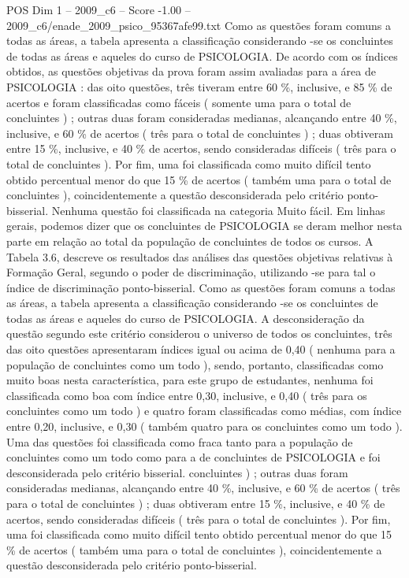 \begin{textsample}{POS Dim 1 – 2009\_c6 – Score -1.00 – 2009\_c6/enade\_2009\_psico\_95367afe99.txt}
Como as questões foram comuns a todas as áreas, a tabela apresenta a classificação considerando -se os concluintes de todas as áreas e aqueles do curso de PSICOLOGIA.
De acordo com os índices obtidos, as questões objetivas da prova foram assim avaliadas para a área de PSICOLOGIA : das oito questões, três tiveram entre 60 \%, inclusive, e 85 \% de acertos e foram classificadas como fáceis ( somente uma para o total de concluintes ) ; outras duas foram consideradas medianas, alcançando entre 40 \%, inclusive, e 60 \% de acertos ( três para o total de concluintes ) ; duas obtiveram entre 15 \%, inclusive, e 40 \% de acertos, sendo consideradas difíceis ( três para o total de concluintes ).
Por fim, uma foi classificada como muito difícil tento obtido percentual menor do que 15 \% de acertos ( também uma para o total de concluintes ), coincidentemente a questão desconsiderada pelo critério ponto-bisserial.
Nenhuma questão foi classificada na categoria Muito fácil.
Em linhas gerais, podemos dizer que os concluintes de PSICOLOGIA se deram melhor nesta parte em relação ao total da população de concluintes de todos os cursos.
A Tabela 3.6, descreve os resultados das análises das questões objetivas relativas à Formação Geral, segundo o poder de discriminação, utilizando -se para tal o índice de discriminação ponto-bisserial.
Como as questões foram comuns a todas as áreas, a tabela apresenta a classificação considerando -se os concluintes de todas as áreas e aqueles do curso de PSICOLOGIA.
A desconsideração da questão segundo este critério considerou o universo de todos os concluintes, três das oito questões apresentaram índices igual ou acima de 0,40 ( nenhuma para a população de concluintes como um todo ), sendo, portanto, classificadas como muito boas nesta característica, para este grupo de estudantes, nenhuma foi classificada como boa com índice entre 0,30, inclusive, e 0,40 ( três para os concluintes como um todo ) e quatro foram classificadas como médias, com índice entre 0,20, inclusive, e 0,30 ( também quatro para os concluintes como um todo ).
Uma das questões foi classificada como fraca tanto para a população de concluintes como um todo como para a de concluintes de PSICOLOGIA e foi desconsiderada pelo critério bisserial. concluintes ) ; outras duas foram consideradas medianas, alcançando entre 40 \%, inclusive, e 60 \% de acertos ( três para o total de concluintes ) ; duas obtiveram entre 15 \%, inclusive, e 40 \% de acertos, sendo consideradas difíceis ( três para o total de concluintes ).
Por fim, uma foi classificada como muito difícil tento obtido percentual menor do que 15 \% de acertos ( também uma para o total de concluintes ), coincidentemente a questão desconsiderada pelo critério ponto-bisserial.

\end{textsample}
